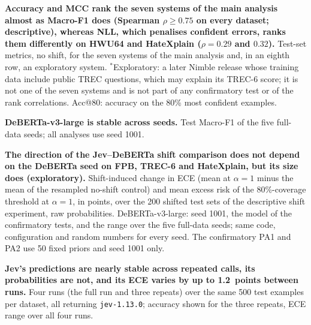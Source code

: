 \begin{table}[htbp]
  \centering
  \caption{\textbf{Accuracy and MCC rank the seven systems of the main analysis almost as Macro-F1 does (Spearman
  $\rho\ge0.75$ on every dataset; descriptive), whereas NLL, which penalises confident errors, ranks them differently on
  HWU64 and HateXplain ($\rho=0.29$ and $0.32$).} Test-set metrics, no shift, for the seven systems of the main analysis
  and, in an eighth row, an exploratory system. $^\ast$Exploratory: a later Nimble release whose training data include
  public TREC questions, which may explain its TREC-6 score; it is not one of the seven systems and is not part of any
  confirmatory test or of the rank correlations. Acc@80: accuracy on the 80\% most confident examples.}
  \label{tab:exp1full}
  \scriptsize
  \setlength{\tabcolsep}{3pt}
  
\end{table}

\begin{table}[htbp]
  \centering
  \caption{\textbf{DeBERTa-v3-large is stable across seeds.} Test Macro-F1 of the five full-data seeds; all analyses use
  seed 1001.}
  \label{tab:seeds}
  \scriptsize
  
\end{table}

\begin{table}[htbp]
  \centering
  \caption{\textbf{The direction of the Jev--DeBERTa shift comparison does not depend on the DeBERTa seed on FPB, TREC-6
  and HateXplain, but its size does (exploratory).} Shift-induced change in ECE (mean at $\alpha=1$ minus the mean of
  the resampled no-shift control) and mean excess risk of the 80\%-coverage threshold at $\alpha=1$, in points, over the
  200 shifted test sets of the descriptive shift experiment, raw probabilities. DeBERTa-v3-large: seed 1001, the model
  of the confirmatory tests, and the range over the five full-data seeds; same code, configuration and random numbers
  for every seed. The confirmatory PA1 and PA2 use 50 fixed priors and seed 1001 only.}
  \label{tab:debseedshift}
  \scriptsize
  \setlength{\tabcolsep}{4pt}
  
\end{table}

\begin{table}[htbp]
  \centering
  \caption{\textbf{Jev's predictions are nearly stable across repeated calls, its probabilities are not, and its ECE
  varies by up to 1.2~points between runs.} Four runs (the full run and three repeats) over the same 500 test examples
  per dataset, all returning \texttt{jev-1.13.0}; accuracy shown for the three repeats, ECE range over all four runs.}
  \label{tab:jevrepeat}
  \scriptsize
  
\end{table}

